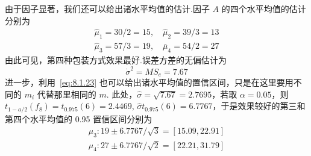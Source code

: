 \begin{example}
  由于因子显著，我们还可以给出诸水平均值的估计.因子 $A$ 的四个水平均值的估计分别为 
  \begin{gather*}
    \hat{\mu}_{1}=30 / 2=15, \quad \hat{\mu}_{2}=39 / 3=13 \\
    \hat{\mu}_{3}=57 / 3=19, \quad \bar{\mu}_{4}=54 / 2=27
  \end{gather*} 
  由此可见，第四种包装方式效果最好.误差方差的无偏估计为
  \begin{equation*}
    \dot{\sigma}^{2}=M S_{e}=7.67
  \end{equation*}
  进一步，利用~\eqref{eq:8.1.23} 也可以给出诸水平均值的置信区间，只是在这里要用不同的 $m_i$ 代替那里相同的 $m$. 此处，$\hat{\sigma} = \sqrt{7.67}=2.7695$，若取 $\alpha=0.05$，则 $t_{1-a / 2}\left(f_{8}\right)=t_{0.975}(6)=2.4469$, $\hat{\sigma} t_{0.975}(6)=6.7767$，于是效果较好的第三和第四个水平均值的 0.95 置信区间分别为
\begin{gather*}
  \mu_{3} : 19 \pm 6.7767 / \sqrt{3}=[15.09,22.91] \\
  \mu_{4} : 27 \pm 6.7767 / \sqrt{2}=[22.21,31.79]
\end{gather*}
\end{example}

